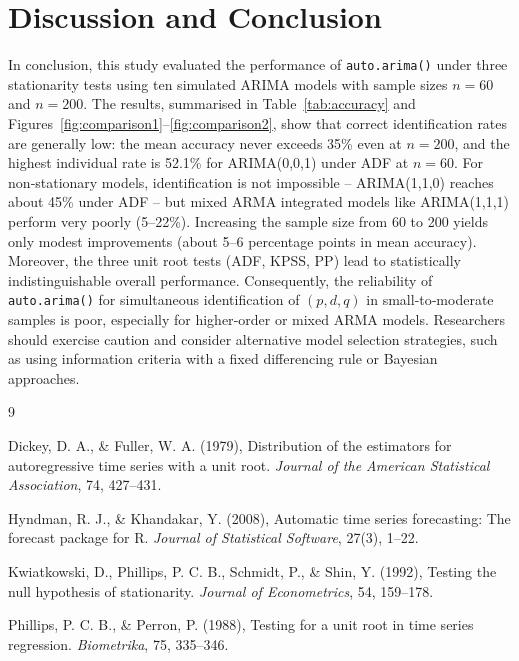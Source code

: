 \documentclass[twoside]{article}
\begin{document}
\section*{Discussion and Conclusion}
\hspace{4mm}
In conclusion, this study evaluated the performance of \texttt{auto.arima()} under three stationarity tests using ten simulated ARIMA models with sample sizes \(n=60\) and \(n=200\). The results, summarised in Table~\ref{tab:accuracy} and Figures~\ref{fig:comparison1}--\ref{fig:comparison2}, show that correct identification rates are generally low: the mean accuracy never exceeds 35\% even at \(n=200\), and the highest individual rate is 52.1\% for ARIMA(0,0,1) under ADF at \(n=60\). For non‑stationary models, identification is not impossible – ARIMA(1,1,0) reaches about 45\% under ADF – but mixed ARMA integrated models like ARIMA(1,1,1) perform very poorly (5–22\%). Increasing the sample size from 60 to 200 yields only modest improvements (about 5–6 percentage points in mean accuracy). Moreover, the three unit root tests (ADF, KPSS, PP) lead to statistically indistinguishable overall performance. Consequently, the reliability of \texttt{auto.arima()} for simultaneous identification of \((p,d,q)\) in small‑to‑moderate samples is poor, especially for higher‑order or mixed ARMA models. Researchers should exercise caution and consider alternative model selection strategies, such as using information criteria with a fixed differencing rule or Bayesian approaches.
\begin{thebibliography}{9}

Dickey, D. A., \& Fuller, W. A. (1979),
Distribution of the estimators for autoregressive time series with a unit root.
\textit{Journal of the American Statistical Association}, 74, 427–431.

Hyndman, R. J., \& Khandakar, Y. (2008),
Automatic time series forecasting: The forecast package for R.
\textit{Journal of Statistical Software}, 27(3), 1–22.

Kwiatkowski, D., Phillips, P. C. B., Schmidt, P., \& Shin, Y. (1992),
Testing the null hypothesis of stationarity.
\textit{Journal of Econometrics}, 54, 159–178.

Phillips, P. C. B., \& Perron, P. (1988),
Testing for a unit root in time series regression.
\textit{Biometrika}, 75, 335–346.
\end{thebibliography}
\end{document}
